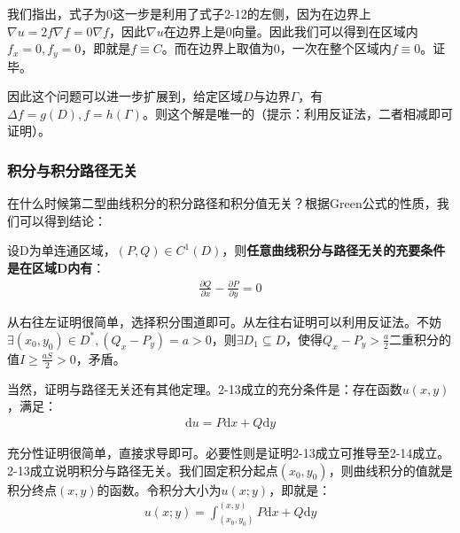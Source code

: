 \documentclass{ctexart}
\let\oldtextbf\textbf
\renewcommand{\textbf}[1]{\textcolor{brown!50!red}{\oldtextbf{#1}}}
\begin{document}
我们指出，式子为0这一步是利用了式子2-12的左侧，因为在边界上$\nabla u=2f\nabla f=0\nabla f$，因此$\nabla u$在边界上是0向量。因此我们可以得到在区域内$f_x=0,f_y=0$，即就是$f\equiv C$。而在边界上取值为0，一次在整个区域内$f\equiv 0$。证毕。
\begin{tcolorbox}[
    colback=bac2,     %
    colframe=fra2,   %
    coltitle=white,             %
    coltext=tex2,
    title=多说一点,
    fonttitle=\bfseries,        %
arc=3mm,                     %
breakable
]
因此这个问题可以进一步扩展到，给定区域$D$与边界$\Gamma$，有$\Delta f=g(D),f=h(\Gamma)$。则这个解是唯一的（提示：利用反证法，二者相减即可证明）。
\end{tcolorbox}

\subsubsection{积分与积分路径无关}
在什么时候第二型曲线积分的积分路径和积分值无关？根据Green公式的性质，我们可以得到结论：
\begin{tcolorbox}[
    colback=bac2,     %
    colframe=fra2,   %
    coltitle=white,             %
    coltext=tex2,
    title=积分与路径无关,
    fonttitle=\bfseries,        %
arc=3mm,                     %
breakable
]
设D为单连通区域，$(P,Q)\in C^1 (D)$，则\textbf{\color{brown!50!red}任意曲线积分与路径无关的充要条件是在区域D内有}：
\begin{align*}
\frac{\partial  Q}{\partial  x}-
\frac{\partial P}{\partial  y}  =0\tag{2-13}
\end{align*}
\end{tcolorbox}

从右往左证明很简单，选择积分围道即可。从左往右证明可以利用反证法。不妨$\exists (x_0,y_0)\in D^*,(Q_x-P_y)=a>0$，则$\exists D_1\subseteq D$，使得$Q_x-P_y>\frac{a}{2}$二重积分的值$ I \geq \frac{aS}{2}>0 $，矛盾。

当然，证明与路径无关还有其他定理。2-13成立的充分条件是：存在函数$u(x,y)$，满足：
\begin{align*}
\mathrm{d}u=P\mathrm{d}x+Q\mathrm{d}y  \tag{2-14}
\end{align*}

充分性证明很简单，直接求导即可。必要性则是证明2-13成立可推导至2-14成立。2-13成立说明积分与路径无关。我们固定积分起点$(x_0,y_0)$，则曲线积分的值就是积分终点$(x,y)$的函数。令积分大小为$u(x;y)$，即就是：
\begin{align*}
u(x;y)=\int_{(x_0,y_0)}^{(x,y)}P\mathrm{d}x+Q\mathrm{d}y   
\end{align*}
\end{document}
